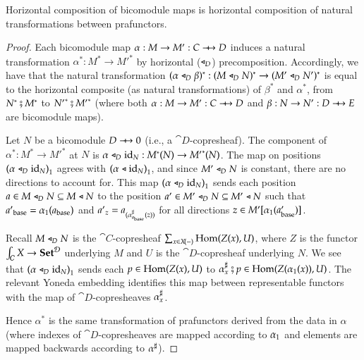 \documentclass{amsart}
\begin{document}
\begin{prop}
  Horizontal composition of bicomodule maps is horizontal composition
  of natural transformations between prafunctors.
\end{prop}
\begin{proof}
  Each bicomodule map $\alpha: M \to M': C \bim D$ induces a natural
  transformation $\alpha^*:M^* \to {M'}^*$ by horizontal ($\mathrel{\triangleleft}_D$)
  precomposition. Accordingly, we have that the natural transformation
  $(\alpha \mathrel{\triangleleft}_D \beta)^*: (M \mathrel{\triangleleft}_D N)^* \to (M' \mathrel{\triangleleft}_D N')^*$ is
  equal to the horizontal composite (as natural transformations) of
  $\beta^*$ and $\alpha^*$, from $N^* \fatsemi M^*$ to
  ${N'}^* \fatsemi {M'}^*$ (where both $\alpha: M \to M': C \bim D$
  and $\beta: N \to N': D \bim E$ are bicomodule maps).

  Let $N$ be a bicomodule $D \bim 0$ (i.e., a
  $\cat{D}$-copresheaf). The component of $\alpha^*: M^* \to {M'}^*$
  at $N$ is $\alpha \mathrel{\triangleleft}_D \mathrm{id}_N: M^*(N) \to {M'}^*(N)$. The map on
  positions ${(\alpha \mathrel{\triangleleft}_D \mathrm{id}_N)}_1$ agrees with
  ${(\alpha \mathrel{\triangleleft} \mathrm{id}_N)}_1$, and since $M' \mathrel{\triangleleft}_D N$ is constant,
  there are no directions to account for. This map
  ${(\alpha \mathrel{\triangleleft}_D \mathrm{id}_N)}_1$ sends each position
  ${a \in M \mathrel{\triangleleft}_D N \subseteq M \mathrel{\triangleleft} N}$ to the position
  ${a' \in M' \mathrel{\triangleleft}_D N \subseteq M' \mathrel{\triangleleft} N}$ such that
  ${a'}_{\mathrm{base}} = {\alpha}_1(a_{\mathrm{base}})$ and
  ${{a'}_z = a_{({\alpha}^\sharp_{a_{\mathrm{base}}}(z))}}$ for all directions
  $z \in M'[{\alpha}_1(a'_{\mathrm{base}})]$.

  Recall $M \mathrel{\triangleleft}_D N$ is the $\cat{C}$-copresheaf
  $\sum_{x \in X\!(-)} \operatorname{Hom}(Z(x),U)$, where $Z$ is the functor
  $\int_{\mathcal{C}}X \to {\normalfont\mathbf{Set}}^{\mathcal{D}}$ underlying $M$ and $U$ is the
  $\cat{D}$-copresheaf underlying $N$. We see that
  ${(\alpha \mathrel{\triangleleft}_D \mathrm{id}_N)}_1$ sends each ${p \in \operatorname{Hom}(Z(x),U)}$
  to
  ${\alpha}^\sharp_{x} \fatsemi {p \in
    \operatorname{Hom}(Z({\alpha}_1(x)),U)}$. The relevant Yoneda embedding
  identifies this map between representable functors with the map of
  $\cat{D}$-copresheaves ${\alpha}^\sharp_{x}$.

  Hence $\alpha^*$ is the same transformation of prafunctors derived
  from the data in $\alpha$ (where indexes of $\cat{D}$-copresheaves
  are mapped according to ${\alpha}_1$ and elements are mapped
  backwards according to ${\alpha}^\sharp$).
\end{proof}
\end{document}
